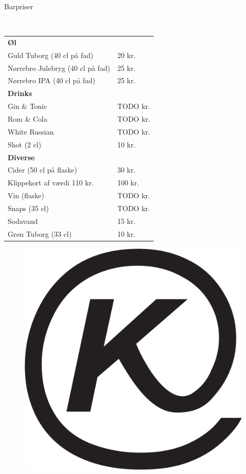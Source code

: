 \begin{flushleft}
\begin{huge}
Barpriser
\end{huge}
\\[.1cm]
\begin{table}[h!]
\begin{tabular}{p{} p{}}
\textbf{Øl} & \\
Guld Tuborg (40 cl på fad) & 20 kr.\\
Nørrebro Julebryg (40 cl på fad) & 25 kr.\\
Nørrebro IPA (40 cl på fad) & 25 kr.\\[2ex]
\textbf{Drinks} & \\
Gin \& Tonic & TODO kr.\\
Rom \& Cola & TODO kr.\\
White Russian & TODO kr.\\
Shot (2 cl) & 10 kr.\\[2ex]
\textbf{Diverse} & \\
Cider (50 cl på flaske) & 30 kr. \\
Klippekort af værdi 110 kr. & 100 kr.\\
Vin (flaske) & TODO kr.\\
Snaps (35 cl) & TODO kr.\\
Sodavand & 15 kr.\\
Grøn Tuborg (33 cl) & 10 kr.\\
\end{tabular}
\end{table}
\end{flushleft}
\begin{figure}[h!]
    \begin{center}
    \includegraphics[width=.45\linewidth]{../logo.pdf}
\end{center}
\end{figure}
